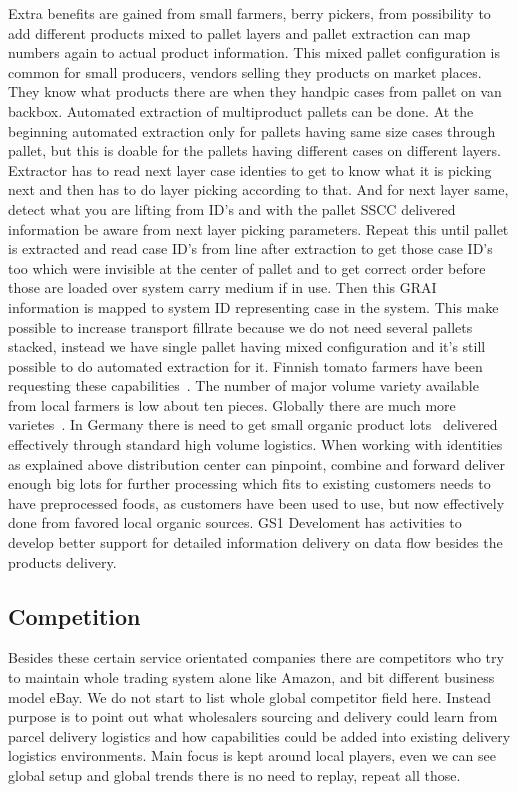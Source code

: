 Extra benefits are gained from small farmers, berry pickers, from possibility
to add different products mixed to pallet layers and pallet extraction can map
numbers again to actual product information. This mixed pallet configuration
is common for small producers, vendors selling they products on market places.
They know what products there are when they handpic cases from pallet on van
backbox. Automated extraction of multiproduct pallets can be done. At the
beginning automated extraction only for pallets having same size cases
through pallet, but this is doable for the pallets having different cases on
different layers. Extractor has to read next layer case identies to get to
know what it is picking next and then has to do layer picking according
to that. And for next layer same, detect what you are lifting from ID's and
with the pallet SSCC delivered information be aware from next layer picking
parameters. Repeat this until pallet is extracted and read case ID's from line
after extraction to get those case ID's too which were invisible at the center
of pallet and to get correct order before those are loaded over system carry
medium if in use. Then this GRAI information is mapped to system ID
representing case in the system. This make possible to increase transport
fillrate because we do not need several pallets stacked, instead we have
single pallet having mixed configuration and it's still possible to do
automated extraction for it. Finnish tomato farmers have been requesting these
capabilities~\cite{WaterBalls}. The number of major volume variety available
from local farmers is low about ten pieces. Globally there are much more
varietes~\cite{PlantVariety}. In Germany there is need to get small organic
product lots~\cite{FSW_NRWC2024} delivered effectively through standard high
volume logistics. When working with identities as explained above distribution
center can pinpoint, combine and forward deliver enough big lots for further
processing which fits to existing customers needs to have preprocessed foods,
as customers have been used to use, but now effectively done from favored
local organic sources. GS1 Develoment has
activities\allowbreak\cite{GS1Development}\allowbreak\cite{GS1Traceability}
to develop better support for detailed information delivery on data flow
besides the products delivery.

\subsection{Competition}\label{competition}
Besides these certain service orientated companies there are competitors who
try to maintain whole trading system alone like Amazon\allowbreak\cite{
Amazon}, and bit different business model eBay\allowbreak\cite{eBay}. We do
not start to list whole global competitor field here. Instead purpose is to
point out what wholesalers sourcing and delivery could learn from parcel
delivery logistics and how capabilities could be added into existing delivery
logistics environments. Main focus is kept around local players, even we can
see global setup and global trends there is no need to replay, repeat all
those.

